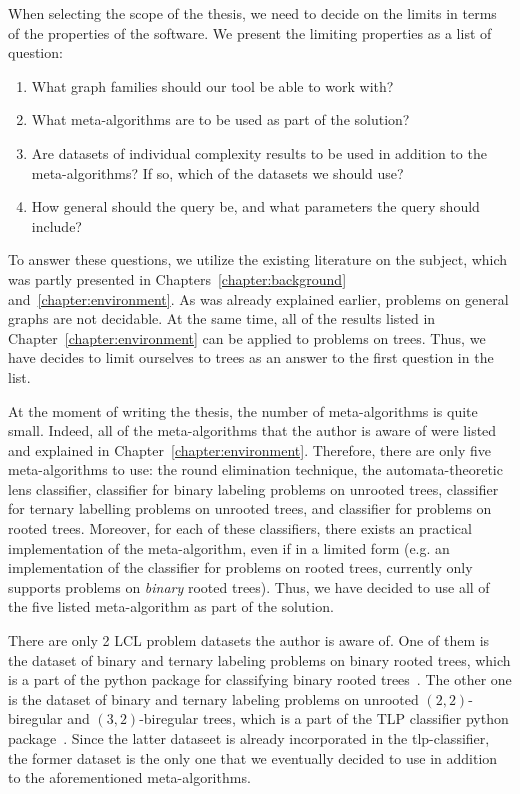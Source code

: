When selecting the scope of the thesis, we need to decide on the limits
in terms of the properties of the software. We present the limiting properties
as a list of question:

\begin{enumerate}
  \item What graph families should our tool be able to work with?
  \item What meta-algorithms are to be used as part of the solution?
  \item Are datasets of individual complexity results to be used
  in addition to the meta-algorithms? If so, which of the datasets we should use?
  \item How general should the query be, and what parameters the query should include?
\end{enumerate}

To answer these questions, we utilize the existing literature on the subject, which was partly presented in Chapters~\ref{chapter:background} and~\ref{chapter:environment}. As was already explained earlier, problems on general graphs are not decidable. At the same time, all of the results listed in Chapter~\ref{chapter:environment} can be applied to problems on trees. Thus,
we have decides to limit ourselves to trees as an answer to the first question in the list.

At the moment of writing the thesis, the number of meta-algorithms is
quite small. Indeed, all of the meta-algorithms that the author is aware of were listed and explained in Chapter~\ref{chapter:environment}. Therefore, there are only five meta-algorithms to use: the round elimination technique, the automata-theoretic lens classifier, classifier for binary labeling problems on unrooted trees, classifier for ternary labelling problems on unrooted trees, and classifier for problems on rooted trees. Moreover, for each of these classifiers, there exists an practical implementation of the meta-algorithm, even if in a limited form (e.g. an implementation of the classifier for problems on rooted trees, currently only supports problems on \emph{binary} rooted trees). Thus, we have decided to use all of the five listed meta-algorithm as part of the solution.

There are only 2 LCL problem datasets the author is aware of. One of them is the dataset of binary and ternary labeling problems on binary rooted trees, which is a
part of the python package for classifying binary rooted trees~\cite{Tereshchenko2020brt}. The other one is the dataset of binary and ternary labeling problems on
unrooted $(2, 2)$-biregular and $(3, 2)$-biregular trees, which is a part of the TLP classifier python package~\cite{Rocher2020clas}. Since the latter dataseet is already incorporated in the tlp-classifier,
the former dataset is the only one that we eventually decided to use
in addition to the aforementioned meta-algorithms.

